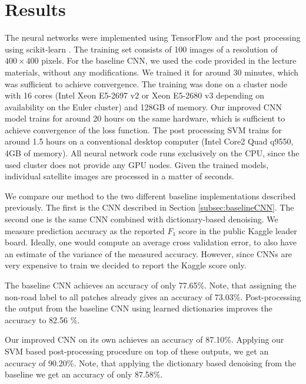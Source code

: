 \documentclass[10pt,conference,compsocconf]{IEEEtran}
\begin{document}
\section{Results}
\label{sec:results}
The neural networks were implemented using TensorFlow \cite{tensorflow.2015} and the post processing using scikit-learn \cite{sklearn.2011}. The training set consists of 100 images of a resolution of $ 400 \times 400 $ pixels. For the baseline CNN, we used the code provided in the lecture materials, without any modifications. We trained it for around 30 minutes, which was sufficient to achieve convergence. The training was done on a cluster node with 16 cores (Intel Xeon E5-2697 v2 or Xeon E5-2680 v3 depending on availability on the Euler cluster) and 128GB of memory. Our improved CNN model trains for around 20 hours on the same hardware, which is sufficient to achieve convergence of the loss function. The post processing SVM trains for around 1.5 hours on a conventional desktop computer (Intel Core2 Quad q9550, 4GB of memory). All neural network code runs exclusively on the CPU, since the used cluster does not provide any GPU nodes. Given the trained models, individual satellite images are processed in a matter of seconds.

\par 
We compare our method to the two different baseline implementations described previously. The first is the CNN described in Section \ref{subsec:baselineCNN}. The second one is the same CNN combined with dictionary-based denoising. We measure prediction accuracy as the reported $ F_1 $ score in the public Kaggle leader board. Ideally, one would compute an average cross validation error, to also have an estimate of the variance of the measured accuracy. However, since CNNs are very expensive to train we decided to report the Kaggle score only.

\par
The baseline CNN achieves an accuracy of only 77.65\%. Note, that assigning the non-road label to all patches already gives an accuracy of 73.03\%. Post-processing the output from the baseline CNN using learned dictionaries improves the accuracy to 82.56 \%. 

\par
Our improved CNN on its own achieves an accuracy of  87.10\%. Applying our SVM based post-processing procedure on top of these outputs, we get an accuracy of 90.20\%. Note, that applying the dictionary based denoising from the baseline we get an accuracy of only 87.58\%.
\end{document}
